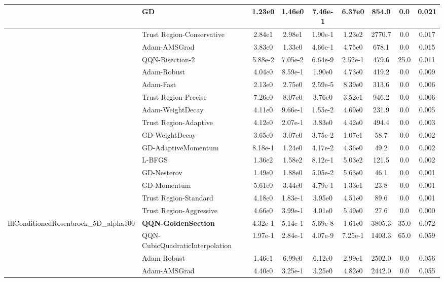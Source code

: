 \documentclass{article}
\begin{document}
\begin{longtable}{|l|l|c|c|c|c|c|c|c|}
\hline
 & GD & 1.23e0 & 1.46e0 & 7.46e-1 & 6.37e0 & 854.0 & 0.0 & 0.021 \\
\hline
 & Trust Region-Conservative & 2.84e1 & 2.98e1 & 1.90e-1 & 1.23e2 & 2770.7 & 0.0 & 0.017 \\
\hline
 & Adam-AMSGrad & 3.83e0 & 1.33e0 & 4.66e-1 & 4.75e0 & 678.1 & 0.0 & 0.015 \\
\hline
 & QQN-Bisection-2 & 5.88e-2 & 7.05e-2 & 6.64e-9 & 2.52e-1 & 479.6 & 25.0 & 0.011 \\
\hline
 & Adam-Robust & 4.04e0 & 8.59e-1 & 1.90e0 & 4.73e0 & 419.2 & 0.0 & 0.009 \\
\hline
 & Adam-Fast & 2.13e0 & 2.75e0 & 2.59e-5 & 8.39e0 & 313.6 & 0.0 & 0.006 \\
\hline
 & Trust Region-Precise & 7.26e0 & 8.07e0 & 3.76e0 & 3.52e1 & 946.2 & 0.0 & 0.006 \\
\hline
 & Adam-WeightDecay & 4.11e0 & 9.66e-1 & 1.55e-2 & 4.69e0 & 231.9 & 0.0 & 0.005 \\
\hline
 & Trust Region-Adaptive & 4.12e0 & 2.07e-1 & 3.83e0 & 4.42e0 & 494.4 & 0.0 & 0.003 \\
\hline
 & GD-WeightDecay & 3.65e0 & 3.07e0 & 3.75e-2 & 1.07e1 & 58.7 & 0.0 & 0.002 \\
\hline
 & GD-AdaptiveMomentum & 8.18e-1 & 1.24e0 & 4.17e-2 & 4.36e0 & 49.2 & 0.0 & 0.002 \\
\hline
 & L-BFGS & 1.36e2 & 1.58e2 & 8.12e-1 & 5.03e2 & 121.5 & 0.0 & 0.002 \\
\hline
 & GD-Nesterov & 1.49e0 & 1.88e0 & 5.05e-2 & 5.63e0 & 46.1 & 0.0 & 0.001 \\
\hline
 & GD-Momentum & 5.61e0 & 3.44e0 & 4.79e-1 & 1.33e1 & 23.8 & 0.0 & 0.001 \\
\hline
 & Trust Region-Standard & 4.18e0 & 1.83e-1 & 3.95e0 & 4.51e0 & 89.6 & 0.0 & 0.001 \\
\hline
 & Trust Region-Aggressive & 4.66e0 & 3.99e-1 & 4.01e0 & 5.49e0 & 27.6 & 0.0 & 0.000 \\
IllConditionedRosenbrock\_5D\_alpha100 & \textbf{QQN-GoldenSection} & 4.32e-1 & 5.14e-1 & 5.69e-8 & 1.61e0 & 3805.3 & 35.0 & 0.072 \\
\hline
 & QQN-CubicQuadraticInterpolation & 1.97e-1 & 2.84e-1 & 4.07e-9 & 7.25e-1 & 1403.3 & 65.0 & 0.059 \\
\hline
 & Adam-Robust & 1.46e1 & 6.99e0 & 6.12e0 & 2.99e1 & 2502.0 & 0.0 & 0.056 \\
\hline
 & Adam-AMSGrad & 4.40e0 & 3.25e-1 & 3.25e0 & 4.82e0 & 2442.0 & 0.0 & 0.055 \\

\end{longtable}
\end{document}
